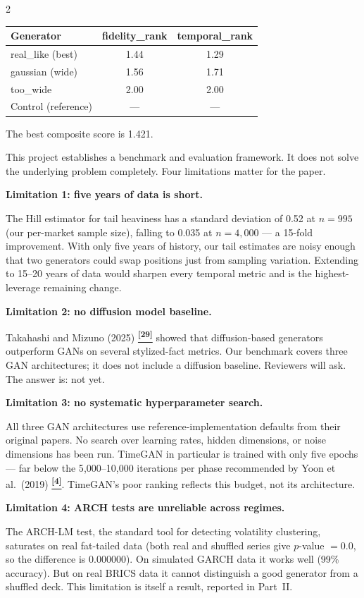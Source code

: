 \documentclass[10pt]{article}
\newcommand{\purplebox}[2]{\begin{tcolorbox}[mybox={Purple}{LBg},title={#1}]#2\end{tcolorbox}}
\newcommand{\tcite}[1]{%
  \hyperlink{R:#1}{\textsuperscript{\scriptsize\textbf{[#1]}}}}
\begin{document}
\begin{multicols}{2}
{\begin{tabular}{@{}lcc@{}}
\toprule
Generator & fidelity\_rank & temporal\_rank \\
\midrule
real\_like (best)  & 1.44 & 1.29 \\
gaussian (wide)    & 1.56 & 1.71 \\
too\_wide          & 2.00 & 2.00 \\
\midrule
Control (reference) & --- & --- \\
\bottomrule
\end{tabular}

\smallskip
The best composite score is 1.421.}

\columnbreak

\purplebox{9\quad What We Still Cannot Do}{%
This project establishes a benchmark and evaluation framework. It does not solve the underlying problem completely. Four limitations matter for the paper.

\medskip
\textbf{Limitation 1: five years of data is short.}

The Hill estimator for tail heaviness has a standard deviation of 0.52 at $n=995$ (our per-market sample size), falling to 0.035 at $n=4{,}000$ --- a 15-fold improvement. With only five years of history, our tail estimates are noisy enough that two generators could swap positions just from sampling variation. Extending to 15--20 years of data would sharpen every temporal metric and is the highest-leverage remaining change.

\medskip
\textbf{Limitation 2: no diffusion model baseline.}

Takahashi and Mizuno (2025)\tcite{29} showed that diffusion-based generators outperform GANs on several stylized-fact metrics. Our benchmark covers three GAN architectures; it does not include a diffusion baseline. Reviewers will ask. The answer is: not yet.

\medskip
\textbf{Limitation 3: no systematic hyperparameter search.}

All three GAN architectures use reference-implementation defaults from their original papers. No search over learning rates, hidden dimensions, or noise dimensions has been run. TimeGAN in particular is trained with only five epochs --- far below the 5{,}000--10{,}000 iterations per phase recommended by Yoon et al.\ (2019)\tcite{4}. TimeGAN's poor ranking reflects this budget, not its architecture.

\medskip
\textbf{Limitation 4: ARCH tests are unreliable across regimes.}

The ARCH-LM test, the standard tool for detecting volatility clustering, saturates on real fat-tailed data (both real and shuffled series give $p$-value $= 0.0$, so the difference is $0.000000$). On simulated GARCH data it works well (99\% accuracy). But on real BRICS data it cannot distinguish a good generator from a shuffled deck. This limitation is itself a result, reported in Part~II.}

\end{multicols}
\end{document}
